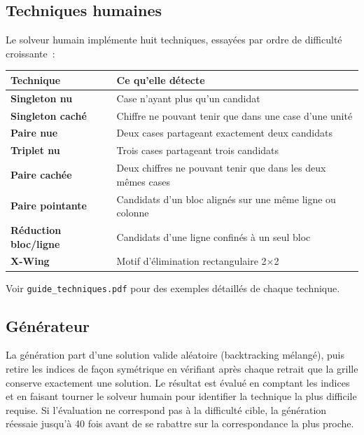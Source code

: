 \subsection{Techniques humaines}

Le solveur humain implémente huit techniques, essayées par ordre de
difficulté croissante~:

\begin{center}
\begin{tabular}{>{\color{darkblue}\bfseries}l l}
\rowcolor{lightblue}
Technique & Ce qu'elle détecte \\
\hline
Singleton nu        & Case n'ayant plus qu'un candidat \\
\rowcolor{softgray}
Singleton caché     & Chiffre ne pouvant tenir que dans une case d'une unité \\
Paire nue           & Deux cases partageant exactement deux candidats \\
\rowcolor{softgray}
Triplet nu          & Trois cases partageant trois candidats \\
Paire cachée        & Deux chiffres ne pouvant tenir que dans les deux mêmes cases \\
\rowcolor{softgray}
Paire pointante     & Candidats d'un bloc alignés sur une même ligne ou colonne \\
Réduction bloc/ligne& Candidats d'une ligne confinés à un seul bloc \\
\rowcolor{softgray}
X-Wing              & Motif d'élimination rectangulaire 2$\times$2 \\
\end{tabular}
\end{center}

Voir \texttt{guide\_techniques.pdf} pour des exemples détaillés de
chaque technique.

\subsection{Générateur}

La génération part d'une solution valide aléatoire (backtracking
mélangé), puis retire les indices de façon symétrique en vérifiant après
chaque retrait que la grille conserve exactement une solution. Le
résultat est évalué en comptant les indices et en faisant tourner le
solveur humain pour identifier la technique la plus difficile requise.
Si l'évaluation ne correspond pas à la difficulté cible, la génération
réessaie jusqu'à 40 fois avant de se rabattre sur la correspondance la
plus proche.

